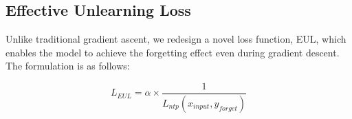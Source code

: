 \documentclass[11pt]{article}
\begin{document}



\subsection{Effective Unlearning Loss}
\label{sec:EUL}


Unlike traditional gradient ascent, we redesign a novel loss function, EUL, which enables the model to achieve the forgetting effect even during gradient descent. The formulation is as follows:

\begin{equation}
L_{EUL}=\alpha  \times  \frac{1}{L_{ntp}(x_{input},y_{forget})}
\end{equation}
\end{document}
